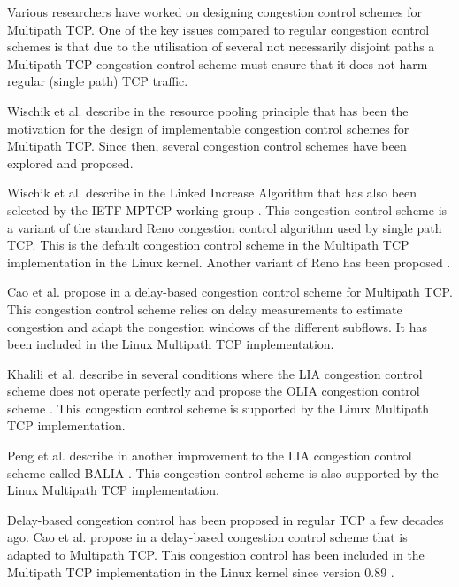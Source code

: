 Various researchers have worked on designing congestion control schemes for Multipath TCP. One of the key issues compared to regular congestion control schemes is that due to the utilisation of several not necessarily disjoint paths a Multipath TCP congestion control scheme must ensure that it does not harm regular (single path) TCP traffic.

Wischik et al. describe in \cite{Wischik_Resource:2008} the resource pooling principle that has been the motivation for the design of implementable congestion control schemes for Multipath TCP. Since then, several congestion control schemes have been explored and proposed.

Wischik et al. describe in \cite{Wischik_Design:2011} the Linked Increase Algorithm that has also been selected by the IETF MPTCP working group \cite{rfc6356}. This congestion control scheme is a variant of the standard Reno congestion control algorithm used by single path TCP. This is the default congestion control scheme in the Multipath TCP implementation in the Linux kernel. Another variant of Reno has been proposed \cite{Vo_mReno:2014}.  %


Cao et al. propose in
\cite{Cao_Delay:2012} %
a delay-based congestion control scheme for Multipath TCP. This congestion control scheme relies on delay measurements to estimate congestion and adapt the congestion windows of the different subflows. It has been included in the Linux Multipath TCP implementation.

Khalili et al. describe in \cite{Khalili_MPTCP:2012,Khalili_MPTCP:2013} several conditions where the LIA congestion control scheme does not operate perfectly and propose the OLIA congestion control scheme \cite{draft-khalili-mptcp-congestion-control}. This congestion control scheme is supported by the Linux Multipath TCP implementation.  %

Peng et al. describe in \cite{Peng_BALIA:2015} another improvement to the LIA congestion control scheme called BALIA \cite{draft-walid-mptcp-congestion-control}. This congestion control scheme is also supported by the Linux Multipath TCP implementation.

Delay-based congestion control has been proposed in regular TCP a few decades ago. Cao et al. propose in \cite{Cao_Delay:2012} a delay-based congestion control scheme that is adapted to Multipath TCP. This congestion control has been included in the Multipath TCP implementation in the Linux kernel since version 0.89 \cite{draft-xu-mptcp-congestion-control}.
